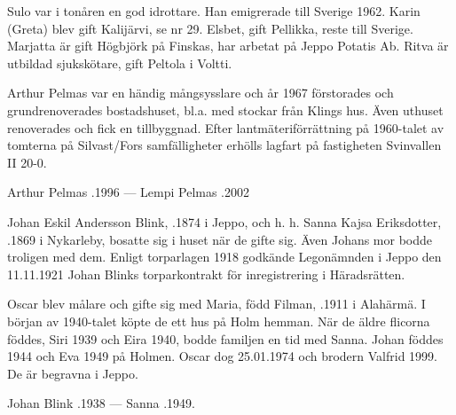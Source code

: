 Sulo var i tonåren en god idrottare. Han emigrerade till Sverige 1962. Karin (Greta) blev gift Kalijärvi, se nr 29. Elsbet, gift Pellikka, reste till Sverige. Marjatta är gift Högbjörk på Finskas, har arbetat på Jeppo Potatis Ab. Ritva är utbildad sjukskötare, gift Peltola i Voltti.

Arthur Pelmas var en händig mångsysslare och år 1967 förstorades och grundrenoverades bostadshuset, bl.a. med stockar från Klings hus. Även uthuset renoverades och fick en tillbyggnad. Efter lantmäteriförrättning på 1960-talet av tomterna på Silvast/Fors samfälligheter erhölls lagfart på fastigheten Svinvallen II 20-0.

Arthur Pelmas .1996  ---  Lempi Pelmas .2002


%
Johan Eskil Andersson Blink, .1874 i Jeppo, och h. h. Sanna Kajsa Eriksdotter, .1869 i Nykarleby, bosatte sig i huset när de gifte sig. Även Johans mor bodde troligen med dem. Enligt torparlagen 1918 godkände Legonämnden i Jeppo den 11.11.1921 Johan Blinks torparkontrakt för inregistrering i Häradsrätten.
\begin{jhchildren}
  \item {}
  \item {}
  \item {}
  \item {}
  \item {}
\end{jhchildren}
Oscar blev målare och gifte sig med Maria, född Filman, .1911 i Alahärmä. I början av 1940-talet köpte de ett hus på Holm hemman. När de äldre flicorna föddes, Siri 1939 och Eira 1940, bodde familjen en tid med Sanna. Johan föddes 1944 och Eva 1949 på Holmen. Oscar dog 25.01.1974 och brodern Valfrid 1999. De är begravna i Jeppo.

Johan Blink .1938  ---  Sanna .1949.


